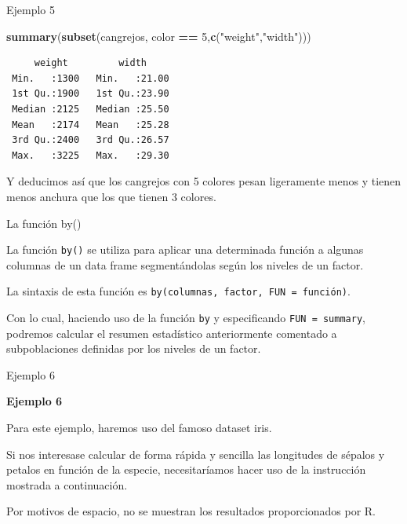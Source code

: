 \documentclass[
  ignorenonframetext,
]{beamer}
\newenvironment{Shaded}{\begin{snugshade}}{\end{snugshade}}
\newcommand{\DataTypeTok}[1]{\textcolor[rgb]{0.13,0.29,0.53}{#1}}
\newcommand{\DecValTok}[1]{\textcolor[rgb]{0.00,0.00,0.81}{#1}}
\newcommand{\KeywordTok}[1]{\textcolor[rgb]{0.13,0.29,0.53}{\textbf{#1}}}
\newcommand{\NormalTok}[1]{#1}
\newcommand{\OperatorTok}[1]{\textcolor[rgb]{0.81,0.36,0.00}{\textbf{#1}}}
\newcommand{\StringTok}[1]{\textcolor[rgb]{0.31,0.60,0.02}{#1}}
\begin{document}
\begin{frame}[fragile]{Ejemplo 5}
\protect\hypertarget{ejemplo-5-2}{}

\begin{Shaded}
\begin{Highlighting}[]
\KeywordTok{summary}\NormalTok{(}\KeywordTok{subset}\NormalTok{(cangrejos, color }\OperatorTok{==}\StringTok{ }\DecValTok{5}\NormalTok{,}\KeywordTok{c}\NormalTok{(}\StringTok{"weight"}\NormalTok{,}\StringTok{"width"}\NormalTok{)))}
\end{Highlighting}
\end{Shaded}

\begin{verbatim}
     weight         width      
 Min.   :1300   Min.   :21.00  
 1st Qu.:1900   1st Qu.:23.90  
 Median :2125   Median :25.50  
 Mean   :2174   Mean   :25.28  
 3rd Qu.:2400   3rd Qu.:26.57  
 Max.   :3225   Max.   :29.30  
\end{verbatim}

Y deducimos así que los cangrejos con 5 colores pesan ligeramente menos
y tienen menos anchura que los que tienen 3 colores.

\end{frame}

\begin{frame}[fragile]{La función by()}
\protect\hypertarget{la-funciuxf3n-by}{}

La función \texttt{by()} se utiliza para aplicar una determinada función
a algunas columnas de un data frame segmentándolas según los niveles de
un factor.

La sintaxis de esta función es
\texttt{by(columnas,\ factor,\ FUN\ =\ función)}.

Con lo cual, haciendo uso de la función \texttt{by} y especificando
\texttt{FUN\ =\ summary}, podremos calcular el resumen estadístico
anteriormente comentado a subpoblaciones definidas por los niveles de un
factor.

\end{frame}

\begin{frame}[fragile]{Ejemplo 6}
\protect\hypertarget{ejemplo-6}{}

\textbf{Ejemplo 6}

Para este ejemplo, haremos uso del famoso dataset iris.

Si nos interesase calcular de forma rápida y sencilla las longitudes de
sépalos y petalos en función de la especie, necesitaríamos hacer uso de
la instrucción mostrada a continuación.

Por motivos de espacio, no se muestran los resultados proporcionados por
R.

\begin{Shaded}
\end{Shaded}

\end{frame}
\end{document}
